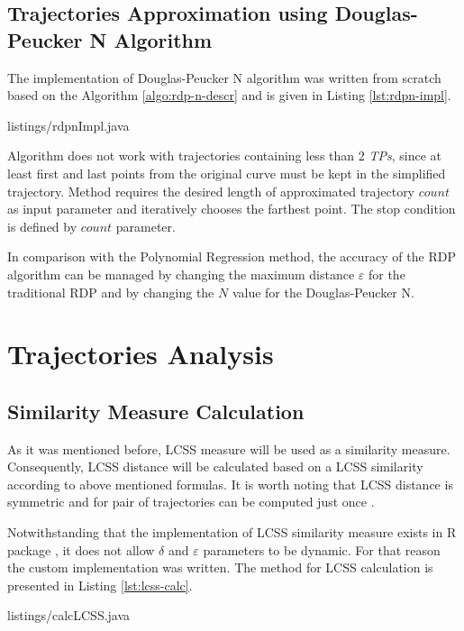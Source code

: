 \subsection{Trajectories Approximation using Douglas-Peucker N Algorithm}

The implementation of Douglas-Peucker N algorithm was written from scratch based on the Algorithm \ref{algo:rdp-n-descr} and is given in Listing \ref{lst:rdpn-impl}.

 {listings/rdpnImpl.java}

Algorithm does not work with trajectories containing less than 2 \textit{TPs}, since at least first and last points from the original curve must be kept in the simplified trajectory. Method requires the desired length of approximated trajectory $count$ as input parameter and iteratively chooses the farthest point. The stop condition is defined by $count$ parameter.

In comparison with the Polynomial Regression method, the accuracy of the RDP algorithm can be managed by changing the maximum distance $\varepsilon$ for the traditional RDP and by changing the $N$ value for the Douglas-Peucker N. 

\section{Trajectories Analysis}

\subsection{Similarity Measure Calculation}

As it was mentioned before, LCSS measure will be used as a similarity measure. Consequently, LCSS distance will be calculated based on a LCSS similarity according to above mentioned formulas. It is worth noting that LCSS distance is symmetric and for pair of trajectories can be computed just once \cite{inproceedings:28_lcss_dsmt}.

Notwithstanding that the implementation of LCSS similarity measure exists in R package \cite{online:r_lcss}, it does not allow $\delta$ and $\varepsilon$ parameters to be dynamic. For that reason the custom implementation was written. The method for LCSS calculation is presented in Listing \ref{lst:lcss-calc}. 

 {listings/calcLCSS.java}

